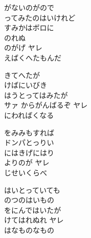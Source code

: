 \documentclass[10pt,b5j]{tarticle} %
\begin{document}
\vspace{1.5em} %
\newcommand{\linespace}{0.5em} %
\newcommand{\blocksize}{0.5\hsize} %
\begin{enumerate} %
    \begin{minipage}[c]{\blocksize}
    
        \vspace{\linespace}
        \item
        がないのがので\\
        ってみたのはいけれど\\
        すみかはボロに\\
        のれぬ\\
        のがげ ヤレ\\
        えばくへたもんだ
        
        \vspace{\linespace}
        \item
        きてへたが\\
        けばにいびき\\
        はうとってはみたが\\
        サァ からがんばるぞ ヤレ\\
        にわればくなる
        
        \vspace{\linespace}
        \item
        をみみもすれば\\
        ドンパとっりい\\
        にはきげにはり\\
        よりのが ヤレ\\
        じせいくらべ
        
        \vspace{\linespace}
        \item
        はいとっていても\\
        のつのはいもの\\
        をにんではいたが\\
        けてはれぬれ ヤレ\\
        はなものなもの
    
    \end{minipage}
\end{enumerate} %
\end{document}
